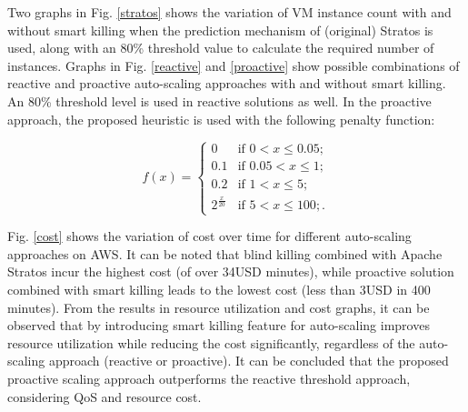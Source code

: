 Two graphs in Fig. \ref{stratos} shows the variation of VM instance count with and without smart killing when the prediction mechanism of (original) Stratos is used, along with an 80\% threshold value to calculate the required number of instances. Graphs in Fig. \ref{reactive} and \ref{proactive} show possible combinations of reactive and proactive auto-scaling approaches with and without smart killing. An 80\% threshold level is used in reactive solutions as well. In the proactive approach, the proposed heuristic is used with the following penalty function:

$$f(x) = \begin{cases} 
0 & \text{if $0 < x \le 0.05$}; \\
0.1 & \text{if $0.05 < x \le 1$}; \\
0.2 & \text{if $1 < x \le 5$};\\
2^{\frac{x}{20}} & \text{if $5 < x \le 100$};.\end{cases} $$

Fig. \ref{cost} shows the variation of cost over time for different auto-scaling approaches on AWS. It can be noted that blind killing combined with Apache Stratos incur the highest cost (of over 34USD minutes), while proactive solution combined with smart killing leads to the lowest cost (less than 3USD in 400 minutes). From the results in resource utilization and cost graphs, it can be observed that by introducing smart killing feature for auto-scaling improves resource utilization while reducing the cost significantly, regardless of the auto-scaling approach (reactive or proactive). It can be concluded that the proposed proactive scaling approach outperforms the reactive threshold approach, considering QoS and resource cost.